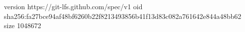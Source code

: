 version https://git-lfs.github.com/spec/v1
oid sha256:fa27bce94af48bf6260b22f8213493856b41f13d83c082a761642e844a48bb62
size 1048672
